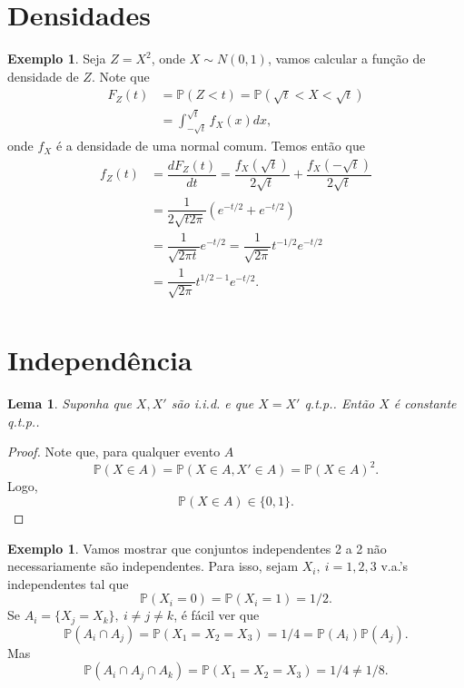 \documentclass[12pt,a4paper,oneside]{book}
\newtheorem{lemma}[theorem]{Lema}
\theoremstyle{definition}
\newtheorem{example}[theorem]{Exemplo}
\theoremstyle{remark}
\numberwithin{equation}{section}
\newcommand{\pr}{\mathbb{P}}
\begin{document}
\section{Densidades}





\begin{tcolorbox}
\begin{example} \label{chi-sqrd} Seja $Z = X^2$, onde $X\sim N(0,1)$, vamos calcular a função de densidade de $Z$. Note que
\begin{align*}
F_Z(t) &= \pr(Z<t) = \pr(\sqrt{t}<X<\sqrt{t}) \\
	&=\int_{-\sqrt{t}}^{\sqrt{t}} f_X(x)dx,
\end{align*}
onde $f_X$ é a densidade de uma normal comum. Temos então que
\begin{align*}
f_Z(t)  &=\dfrac{dF_Z(t)}{dt} = \dfrac{f_X(\sqrt{t})}{2\sqrt{t}}+\dfrac{f_X(-\sqrt{t})}{2\sqrt{t}} \\  
	&= \dfrac{1}{2\sqrt{t 2\pi}}\left(e^{-t/2} + e^{-t/2}    \right)\\
	&= \dfrac{1}{\sqrt{ 2\pi t}}e^{-t/2} = \dfrac{1}{\sqrt{2\pi}}t^{-1/2}e^{-t/2}\\
	&= \dfrac{1}{\sqrt{2\pi}}t^{1/2-1}e^{-t/2}.\\
\end{align*}

\end{example}
\end{tcolorbox}


\newpage
\section{Independência}

\begin{lemma} Suponha que $X,X'$ são i.i.d. e que $X= X'$ q.t.p.. Então $X$ é constante q.t.p..
\end{lemma}
\begin{proof}
Note que, para qualquer evento $A$
$$\pr(X\in A) = \pr(X\in A, X'\in A) = \pr(X\in A)^2. $$
Logo, 
$$\pr(X\in A)\in \{0,1\}. $$
\end{proof}




\begin{example}
Vamos mostrar que conjuntos independentes 2 a 2 não necessariamente são independentes. Para isso, sejam $X_i, \ i=1,2,3$ v.a.'s independentes  tal que
$$\pr(X_i=0)=\pr(X_i=1) = 1/2. $$
Se $A_{i} =\{X_j=X_k\},\  i\neq j\neq k$, é fácil ver que 
$$\pr(A_{i}\cap A_{j}) = \pr(X_1=X_2=X_3)  = 1/4 = \pr(A_i)\pr(A_j).$$
Mas
$$\pr(A_{i}\cap A_{j}\cap A_k) = \pr(X_1=X_2=X_3)  = 1/4 \neq 1/8. $$
\end{example}
\end{document}
